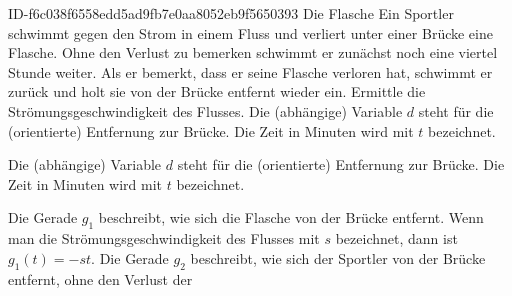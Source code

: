 \begin{exercise}
      {ID-f6c038f6558edd5ad9fb7e0aa8052eb9f5650393}
      {Die Flasche}
  \ifproblem\problem
    Ein Sportler schwimmt gegen den Strom in einem Fluss und verliert unter
    einer Brücke eine Flasche. Ohne den Verlust zu bemerken schwimmt er
    zunächst noch eine viertel Stunde weiter. Als er bemerkt, dass er seine
    Flasche verloren hat, schwimmt er zurück und holt sie  von der
    Brücke entfernt wieder ein. Ermittle die Strömungsgeschwindigkeit des
    Flusses.
  \fi
  \ifoutline\outline
    Die (abhängige) Variable $d$ steht für die (orientierte) Entfernung
    zur Brücke. Die Zeit in Minuten wird mit $t$ bezeichnet.
    \begin{center}
    \end{center}
  \fi
  \ifoutcome\outcome
    Die (abhängige) Variable $d$ steht für die (orientierte) Entfernung
    zur Brücke. Die Zeit in Minuten wird mit $t$ bezeichnet.
    \begin{center}
    \end{center}
    Die Gerade $g_{1}$ beschreibt, wie sich die Flasche von der Brücke
    entfernt. Wenn man die Strömungsgeschwindigkeit des Flusses mit $s$
    bezeichnet, dann ist $g_{1}(t)=-st$. Die Gerade $g_{2}$ beschreibt,
    wie sich der Sportler von der Brücke entfernt, ohne den Verlust der

\end{exercise}
